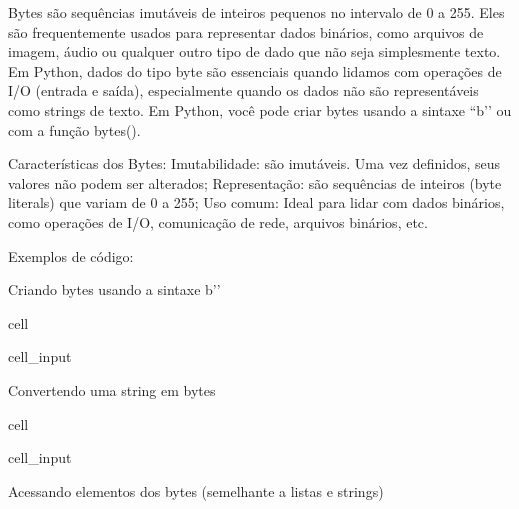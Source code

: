 \documentclass[letterpaper,10pt,english]{jupyterBook}
\begin{document}
\sphinxAtStartPar
Bytes são sequências imutáveis de inteiros pequenos no intervalo de 0 a 255. Eles são frequentemente usados para representar dados binários, como arquivos de imagem, áudio ou qualquer outro tipo de dado que não seja simplesmente texto. Em Python, dados do tipo byte são essenciais quando lidamos com operações de I/O (entrada e saída), especialmente quando os dados não são representáveis como strings de texto. Em Python, você pode criar bytes usando a sintaxe “b’’ ou com a função bytes().

\sphinxAtStartPar
Características dos Bytes:
Imutabilidade: são imutáveis. Uma vez definidos, seus valores não podem ser alterados;
Representação: são sequências de inteiros (byte literals) que variam de 0 a 255;
Uso comum: Ideal para lidar com dados binários, como operações de I/O, comunicação de rede, arquivos binários, etc.

\sphinxAtStartPar
Exemplos de código:

\sphinxAtStartPar
Criando bytes usando a sintaxe b’’

\begin{sphinxuseclass}{cell}\begin{sphinxVerbatimInput}

\begin{sphinxuseclass}{cell_input}
\begin{sphinxVerbatim}[commandchars=\\\{\}]
  
\end{sphinxVerbatim}

\end{sphinxuseclass}\end{sphinxVerbatimInput}

\end{sphinxuseclass}
\sphinxAtStartPar
Convertendo uma string em bytes

\begin{sphinxuseclass}{cell}\begin{sphinxVerbatimInput}

\begin{sphinxuseclass}{cell_input}
\begin{sphinxVerbatim}[commandchars=\\\{\}]
  
  
\end{sphinxVerbatim}

\end{sphinxuseclass}\end{sphinxVerbatimInput}

\end{sphinxuseclass}
\sphinxAtStartPar
Acessando elementos dos bytes (semelhante a listas e strings)
\end{document}
